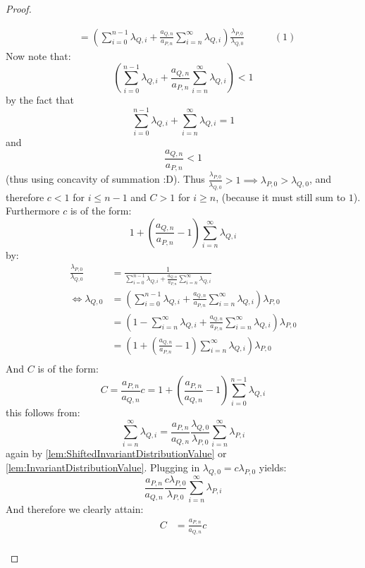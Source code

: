 \begin{proof}
\begin{enumerate}
\begin{align}
        &= \left(\sum_{i=0}^{n-1} \lambda_{Q,i}  + \frac{a_{Q,n}}{a_{P,n}}\sum_{i=n}^{\infty} \lambda_{Q,i}\right) \frac{\lambda_{P,0}}{\lambda_{Q,0}} \label{eqn} \hspace{36pt}(1) %
    \end{align}
    Now note that:
    $$\left(\sum_{i=0}^{n-1} \lambda_{Q,i}  + \frac{a_{Q,n}}{a_{P,n}}\sum_{i=n}^{\infty} \lambda_{Q,i}\right) < 1$$
    by the fact that
    $$\sum_{i=0}^{n-1} \lambda_{Q,i}  + \sum_{i=n}^{\infty} \lambda_{Q,i} = 1$$
    and
    $$\frac{a_{Q,n}}{a_{P,n}} < 1$$
    (thus using concavity of summation :D).
    Thus $\frac{\lambda_{P,0}}{\lambda_{Q,0}} > 1 \implies \lambda_{P,0} > \lambda_{Q,0}$, and therefore
    $c < 1$ for $i \leq n - 1$ and $C > 1$ for $i \geq n$, (because it must still sum to $1$).
    Furthermore $c$ is of the form:
    $$1 + (\frac{a_{Q,n}}{a_{P,n}}-1)\sum_{i=n}^{\infty}\lambda_{Q,i}$$
    by:
    \begin{align*}
      \frac{\lambda_{P,0}}{\lambda_{Q,0}} &= \frac{1}{\sum_{i=0}^{n-1}\lambda_{Q,i} + \frac{a_{Q,n}}{a_{P,n}} \sum_{i=n}^\infty \lambda_{Q,i}}\\
      \iff \lambda_{Q,0} &= \left(\sum_{i=0}^{n-1}\lambda_{Q,i} + \frac{a_{Q,n}}{a_{P,n}} \sum_{i=n}^\infty \lambda_{Q,i}\right)\lambda_{P,0}\\
      &=\left(1-\sum_{i=n}^{\infty}\lambda_{Q,i} + \frac{a_{Q,n}}{a_{P,n}} \sum_{i=n}^\infty \lambda_{Q,i}\right)\lambda_{P,0}\\
      &=\left(1 + (\frac{a_{Q,n}}{a_{P,n}}-1) \sum_{i=n}^\infty \lambda_{Q,i}\right)\lambda_{P,0}\\
    \end{align*}
    And $C$ is of the form:
    $$C = \frac{a_{P,n}}{a_{Q,n}}c = 1 + (\frac{a_{P,n}}{a_{Q,n}}-1) \sum_{i=0}^{n-1}\lambda_{Q,i}$$
    this follows from:
    $$\sum_{i=n}^\infty\lambda_{Q,i} = \frac{a_{P,n}}{a_{Q,n}}\frac{\lambda_{Q,0}}{\lambda_{P,0}}\sum_{i=n}^\infty{\lambda_{P,i}}$$
    again by \ref{lem:ShiftedInvariantDistributionValue} or \ref{lem:InvariantDistributionValue}.
    Plugging in $\lambda_{Q,0} = c \lambda_{P,0}$ yields:
    $$\frac{a_{P,n}}{a_{Q,n}}\frac{c\lambda_{P,0}}{\lambda_{P,0}}\sum_{i=n}^\infty{\lambda_{P,i}}$$
    And therefore we clearly attain:
    \begin{align*}
      C &= \frac{a_{P,n}}{a_{Q,n}} c \\

\end{align*}
\end{enumerate}
\end{proof}
